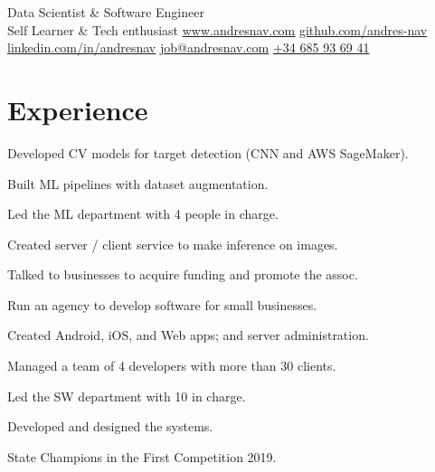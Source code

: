 \documentclass[]{cv}
\begin{document}
{Data Scientist \& Software Engineer \\ Self Learner \& Tech enthusiast}
{\contactline
    {\href{https://www.andresnav.com}{www.andresnav.com}}
    {\href{https://www.github.com/andres-nav}{github.com/andres-nav}}
    {\href{https://www.linkedin.com/in/andresnav}{linkedin.com/in/andresnav}}
    {\href{mailto:job@andresnav.com}{job@andresnav.com}}
    {\href{https://wa.me/34685936941}{+34 685 93 69 41}}
}

\begin{minipage}[t]{0.60\textwidth} 

\section{Experience}

\begin{tightemize}
\item Developed CV models for target detection (CNN and AWS SageMaker).
\item Built ML pipelines with dataset augmentation.
\item Led the ML department with 4 people in charge.
\item Created server / client service to make inference on images.
\item Talked to businesses to acquire funding and promote the assoc.
\end{tightemize}

\begin{tightemize}
\item Run an agency to develop software for small businesses.
\item Created Android, iOS, and Web apps; and server administration.
\item Managed a team of 4 developers with more than 30 clients.
\end{tightemize}

\begin{tightemize}
\item Led the SW department with 10 in charge.
\item Developed and designed the systems.
\item State Champions in the First Competition 2019.
\end{tightemize}


\end{minipage}
\end{document}
